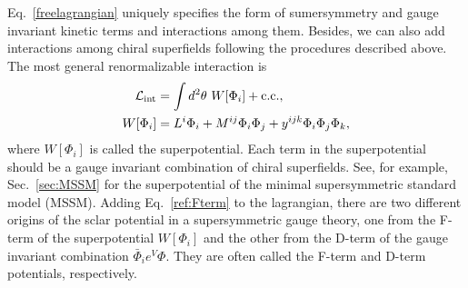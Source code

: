 \documentclass[12pt,twoside,book]{article}
\begin{document}
Eq.~\eqref{freelagrangian} uniquely specifies the form of sumersymmetry and gauge invariant kinetic terms and interactions among them.
Besides, we can also add interactions among chiral superfields following the procedures described above.
The most general renormalizable interaction is
\begin{align}
 \mathcal{L}_{\rm int} &= \int d^2 \theta\ W[\Phi_i] + {\rm c.c.}, \label{ref:Fterm} \\
 W[\Phi_i] &= L^i \Phi_i + M^{ij} \Phi_i \Phi_j + y^{ijk} \Phi_i \Phi_j
 \Phi_k,
\end{align}
where $W[\Phi_i]$ is called the superpotential.
Each term in the superpotential should be a gauge invariant combination of chiral superfields.
See, for example, Sec.~\ref{sec:MSSM} for the superpotential of the minimal supersymmetric standard model (MSSM).
Adding Eq.~\eqref{ref:Fterm} to the lagrangian, there are two different origins of the sclar potential in a supersymmetric gauge theory, one from the F-term of the superpotential $W[\Phi_i]$ and the other from the D-term of the gauge invariant combination $\bar{\Phi}_i e^V \Phi$.
They are often called the F-term and D-term potentials, respectively.

% 
% 
\end{document}
